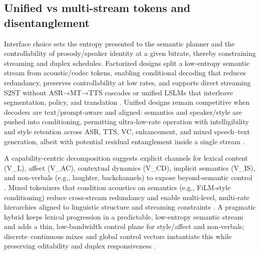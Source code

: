 \documentclass{article}
\begin{document}
\subsection{Unified vs multi-stream tokens and disentanglement} \label{subsec:Unified vs multi-stream tokens and disentanglement}

Interface choice sets the entropy presented to the semantic planner and the controllability of prosody/speaker identity at a given bitrate, thereby constraining streaming and duplex schedules. Factorized designs split a low‑entropy semantic stream from acoustic/codec tokens, enabling conditional decoding that reduces redundancy, preserves controllability at low rates, and supports direct streaming S2ST without ASR→MT→TTS cascades or unified LSLMs that interleave segmentation, policy, and translation \cite{guo2025streamuniachievingstreamingspeechtransla,zhao2024textlessstreamingspeechtranslationsemant,yang2025diffsoundstreamefficientspeechtokenizati}. Unified designs remain competitive when decoders are text/prompt‑aware and aligned: semantics and speaker/style are pushed into conditioning, permitting ultra‑low‑rate operation with intelligibility and style retention across ASR, TTS, VC, enhancement, and mixed speech–text generation, albeit with potential residual entanglement inside a single stream \cite{wang2025tadicodectextawarediffusionspeechtokeniz,wu2024speechcomposerunifyingmultiplespeechtask}.

A capability‑centric decomposition suggests explicit channels for lexical content (V_L), affect (V_AC), contextual dynamics (V_CD), implicit semantics (V_IS), and non‑verbals (e.g., laughter, backchannels) to expose beyond‑semantic control \cite{wang2025bossbeyondsemanticspeech}. Mixed tokenizers that condition acoustics on semantics (e.g., FiLM‑style conditioning) reduce cross‑stream redundancy and enable multi‑level, multi‑rate hierarchies aligned to linguistic structure and streaming constraints \cite{yang2025diffsoundstreamefficientspeechtokenizati}. A pragmatic hybrid keeps lexical progression in a predictable, low‑entropy semantic stream and adds a thin, low‑bandwidth control plane for style/affect and non‑verbals; discrete–continuous mixes and global control vectors instantiate this while preserving editability and duplex responsiveness \cite{yang2025diffsoundstreamefficientspeechtokenizati}.
\end{document}

